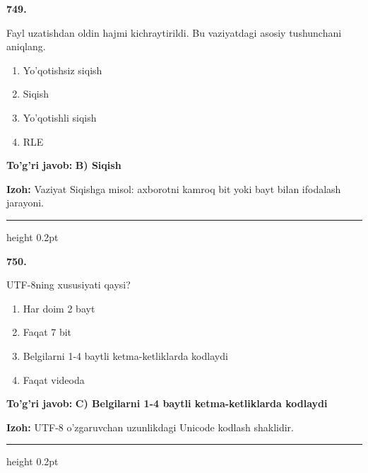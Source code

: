 \documentclass[10pt,a4paper,oneside]{article}
\begin{document}
\noindent\textbf{\color{ink}749.}
\par
Fayl uzatishdan oldin hajmi kichraytirildi. Bu vaziyatdagi asosiy tushunchani aniqlang.
\begin{enumerate}[label=\Alph*),leftmargin=9mm]
\item Yo'qotishsiz siqish
\item Siqish
\item Yo'qotishli siqish
\item RLE
\end{enumerate}
\begin{tcolorbox}[enhanced,breakable,colback=teal!4,colframe=teal!50!black,boxrule=0.5pt,arc=1.1mm,left=3mm,right=3mm,top=1.7mm,bottom=1.7mm,before skip=2mm,after skip=2mm]
\textbf{\color{teal}To'g'ri javob:} \textbf{B) Siqish}
\par\smallskip
\textbf{Izoh:} Vaziyat Siqishga misol: axborotni kamroq bit yoki bayt bilan ifodalash jarayoni.
\end{tcolorbox}
\vspace{2mm}\hrule height 0.2pt \vspace{3mm}

\noindent\textbf{\color{ink}750.}
\par
UTF-8ning xususiyati qaysi?
\begin{enumerate}[label=\Alph*),leftmargin=9mm]
\item Har doim 2 bayt
\item Faqat 7 bit
\item Belgilarni 1-4 baytli ketma-ketliklarda kodlaydi
\item Faqat videoda
\end{enumerate}
\begin{tcolorbox}[enhanced,breakable,colback=teal!4,colframe=teal!50!black,boxrule=0.5pt,arc=1.1mm,left=3mm,right=3mm,top=1.7mm,bottom=1.7mm,before skip=2mm,after skip=2mm]
\textbf{\color{teal}To'g'ri javob:} \textbf{C) Belgilarni 1-4 baytli ketma-ketliklarda kodlaydi}
\par\smallskip
\textbf{Izoh:} UTF-8 o'zgaruvchan uzunlikdagi Unicode kodlash shaklidir.
\end{tcolorbox}
\vspace{2mm}\hrule height 0.2pt \vspace{3mm}
\end{document}
